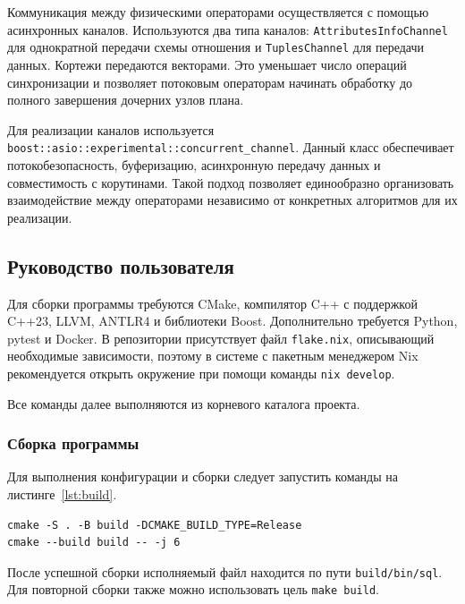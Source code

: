 \documentclass[fontsize=14pt, russian]{scrartcl}
\begin{document}
Коммуникация между физическими операторами осуществляется с помощью асинхронных
каналов. Используются два типа каналов: \verb|AttributesInfoChannel| для
однократной передачи схемы отношения и \verb|TuplesChannel| для передачи данных.
Кортежи передаются векторами. Это уменьшает число операций синхронизации и
позволяет потоковым операторам начинать обработку до полного завершения дочерних
узлов плана.

Для реализации каналов используется
\verb|boost::asio::experimental::concurrent_channel|. Данный класс обеспечивает
потокобезопасность, буферизацию, асинхронную передачу данных и совместимость с
корутинами. Такой подход позволяет единообразно организовать взаимодействие
между операторами независимо от конкретных алгоритмов для их реализации.

\subsection{Руководство пользователя}

Для сборки программы требуются CMake, компилятор C++ с поддержкой C++23, LLVM,
ANTLR4 и библиотеки Boost. Дополнительно требуется Python, pytest и Docker. В
репозитории присутствует файл \texttt{flake.nix}, описывающий необходимые
зависимости, поэтому в системе с пакетным менеджером Nix рекомендуется открыть
окружение при помощи команды \verb|nix develop|.

Все команды далее выполняются из корневого каталога проекта.

\subsubsection{Сборка программы}

Для выполнения конфигурации и сборки следует запустить команды на листинге~\ref{lst:build}.

\begin{listing}[H]
  \caption{Конфигурация и сборка проекта.}
  \label{lst:build}
  \begin{verbatim}
cmake -S . -B build -DCMAKE_BUILD_TYPE=Release
cmake --build build -- -j 6
  \end{verbatim}
\end{listing}

После успешной сборки исполняемый файл находится по пути
\texttt{build/bin/sql}. Для повторной сборки также можно использовать цель
\texttt{make build}.
\end{document}
